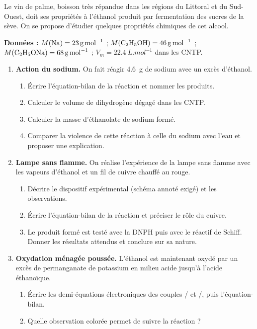 \documentclass[11pt]{article}
\begin{document}
\begin{exercice}
Le vin de palme, boisson très répandue dans les régions du Littoral et du Sud-Ouest, doit ses propriétés à l'éthanol produit par fermentation des sucres de la sève. On se propose d'étudier quelques propriétés chimiques de cet alcool.
\par\textbf{Données :} $M(\ce{Na}) = \SI{23}{g.mol^{-1}}$ ; $M(\ce{C2H5OH}) = \SI{46}{g.mol^{-1}}$ ; $M(\ce{C2H5ONa}) = \SI{68}{g.mol^{-1}}$ ; $V_m = \SI{22,4}{L.mol^{-1}}$ dans les CNTP.
\begin{enumerate}
\item \textbf{Action du sodium.} On fait réagir \SI{4,6}{g} de sodium avec un excès d'éthanol.
\begin{enumerate}
\item Écrire l'équation-bilan de la réaction et nommer les produits.
\item Calculer le volume de dihydrogène dégagé dans les CNTP.
\item Calculer la masse d'éthanolate de sodium formé.
\item Comparer la violence de cette réaction à celle du sodium avec l'eau et proposer une explication.
\end{enumerate}
\item \textbf{Lampe sans flamme.} On réalise l'expérience de la lampe sans flamme avec les vapeurs d'éthanol et un fil de cuivre chauffé au rouge.
\begin{enumerate}
\item Décrire le dispositif expérimental (schéma annoté exigé) et les observations.
\item Écrire l'équation-bilan de la réaction et préciser le rôle du cuivre.
\item Le produit formé est testé avec la DNPH puis avec le réactif de Schiff. Donner les résultats attendus et conclure sur sa nature.
\end{enumerate}
\item \textbf{Oxydation ménagée poussée.} L'éthanol est maintenant oxydé par un excès de permanganate de potassium en milieu acide jusqu'à l'acide éthanoïque.
\begin{enumerate}
\item Écrire les demi-équations électroniques des couples / et /, puis l'équation-bilan.
\item Quelle observation colorée permet de suivre la réaction ?
\end{enumerate}
\end{enumerate}
\end{exercice}
\end{document}
